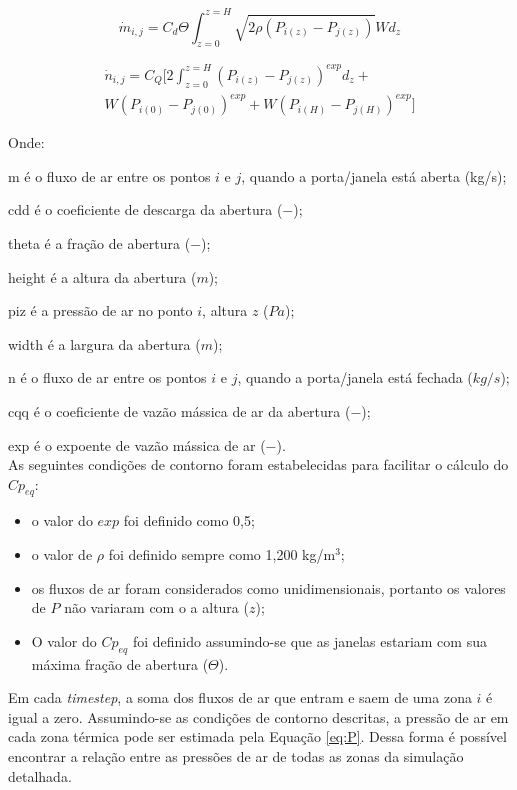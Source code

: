 \begin{equation}
\label{eq:AFEDOP_opened}
\dot{m}_{i,j} = C_d \Theta 	\int_{z=0}^{z=H} \sqrt{2 \rho (P_{i(z)} - P_{j(z)})} W d_z 
\end{equation}

\begin{equation}
\label{eq:AFEDOP_closed}
\begin{split}
\dot{n}_{i,j} = C_Q [2\int_{z=0}^{z=H} {(P_{i(z)} - P_{j(z)})}^{exp} d_z + \\ W{(P_{i(0)} - P_{j(0)})}^{exp} + W{(P_{i(H)} - P_{j(H)})}^{exp}]
\end{split}
\end{equation}

Onde:

\gls{m} é o fluxo de ar entre os pontos $i$ e $j$, quando a porta/janela está aberta (kg/s);

\gls{cdd} é o coeficiente de descarga da abertura ($-$);

\gls{theta} é a fração de abertura ($-$);

\gls{height} é a altura da abertura ($m$);

\gls{piz} é a pressão de ar no ponto $i$, altura $z$ ($Pa$);

\gls{width} é a largura da abertura ($m$);

\gls{n} é o fluxo de ar entre os pontos $i$ e $j$, quando a porta/janela está fechada ($kg/s$);

\gls{cqq} é o coeficiente de vazão mássica de ar da abertura ($-$);

\gls{exp} é o expoente de vazão mássica de ar ($-$).
\\

As seguintes condições de contorno foram estabelecidas para facilitar o cálculo do $Cp_{eq}$:
\begin{itemize}			 
	\item o valor do $exp$ foi definido como 0,5;
	\item o valor de $\rho$ foi definido sempre como 1,200 kg/m$^3$;
	\item os fluxos de ar foram considerados como unidimensionais, portanto os valores de $P$ não variaram com o a altura ($z$);
	\item O valor do $Cp_{eq}$ foi definido assumindo-se que as janelas estariam com sua máxima fração de abertura ($\Theta$).
\end{itemize}

Em cada \textit{timestep}, a soma dos fluxos de ar que entram e saem de uma zona $i$ é igual a zero. Assumindo-se as condições de contorno descritas, a pressão de ar em cada zona térmica pode ser estimada pela Equação \ref{eq:P}. Dessa forma é possível encontrar a relação entre as pressões de ar de todas as zonas da simulação detalhada.

